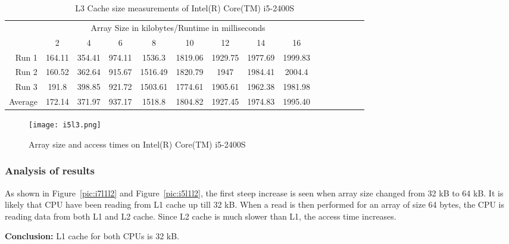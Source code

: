 \documentclass{article}
\begin{document}
\begin{table}[H]

\begin{tabular}{r|c|c|c|c|c|c|c|c|c|c|c|c|c|c|}
\multicolumn{1}{r}{}
 &  \multicolumn{8}{c}{Array Size in kilobytes/Runtime in milliseconds} \\
\cline{2-9}
  & 2 & 4 & 6 & 8 & 10 & 12 & 14 & 16 \\
\cline{2-9}
Run 1 & 164.11 &	354.41 &	974.11 &	1536.3 &	1819.06 &	1929.75 &	1977.69 &	1999.83 \\
\cline{2-9}
Run 2 & 160.52 &	362.64 &	915.67 &	1516.49 &	1820.79 &	1947 &	1984.41 &	2004.4 \\
\cline{2-9}
Run 3 & 191.8 &	398.85 &	921.72 &	1503.61 &	1774.61 &	1905.61 &	1962.38 &	1981.98 \\
\cline{2-9}
Average & 172.14 &	371.97 &	937.17 &	1518.8 &	1804.82 &	1927.45 &	1974.83 &	1995.40 \\
\cline{2-9}
\end{tabular}
 \caption{L3 Cache size measurements of Intel(R) Core(TM) i5-2400S}
 \label{tab:i5L3}
\end{table}

\begin{comment}
164.11 &	354.41 &	974.11 &	1536.3 &	1819.06 &	1929.75 &	1977.69 &	1999.83
160.52 &	362.64 &	915.67 &	1516.49 &	1820.79 &	1947 &	1984.41 &	2004.4
191.8 &	398.85 &	921.72 &	1503.61 &	1774.61 &	1905.61 &	1962.38 &	1981.98
172.14 &	371.97 &	937.17 &	1518.8 &	1804.82 &	1927.45 &	1974.83 &	1995.40
\end{comment}

\begin{figure}[H]
\centering
\texttt{[image: i5l3.png]}
\caption{Array size and access times on Intel(R) Core(TM) i5-2400S}
\label{pic:i5l3}
\end{figure}

\subsubsection{Analysis of results}

As shown in Figure~\ref{pic:i7l1l2} and Figure~\ref{pic:i5l1l2}, the first steep increase is seen when array size changed from 32 kB to 64 kB. It is likely that CPU have been reading from L1 cache up till 32 kB. When a read is then performed for an array of size 64 bytes, the CPU is reading data from both L1 and L2 cache. Since L2 cache is much slower than L1, the access time increases. 
\begin{list}{•}{•}
\item \textbf{Conclusion:} L1 cache for both CPUs is 32 kB.
\end{list}
\end{document}
